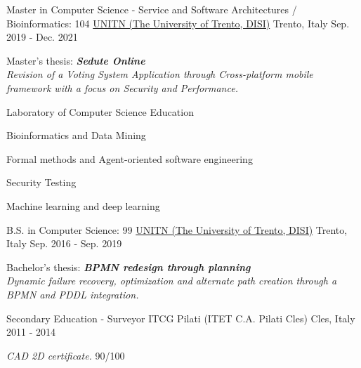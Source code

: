 

\begin{cventries}


  \cventry
    {Master in Computer Science - Service and Software Architectures / Bioinformatics: 104} %
    {\href{https://www.unitn.it/}{UNITN (The University of Trento, DISI)}}  %
    {Trento, Italy} %
    {Sep. 2019 - Dec. 2021} %
    {
      \begin{cvitems} %
        \item {Master's thesis: \textbf{\textit{Sedute Online}}\\\textit{Revision of a Voting System Application through Cross-platform mobile framework with a focus on Security and Performance.}}
        \item {Laboratory of Computer Science Education}
        \item {Bioinformatics and Data Mining}
        \item {Formal methods and Agent-oriented software engineering}
        \item {Security Testing}
        \item {Machine learning and deep learning}
      \end{cvitems}
    }

  \cventry
    {B.S. in Computer Science: 99} %
    {\href{https://www.unitn.it/}{UNITN (The University of Trento, DISI)}}  %
    {Trento, Italy} %
    {Sep. 2016 - Sep. 2019} %
    {
      \begin{cvitems} %
        \item {Bachelor's thesis: \textbf{\textit{BPMN redesign through planning}} \\\textit{Dynamic failure recovery, optimization and alternate path creation through a BPMN and PDDL integration.}}
      \end{cvitems}
    }

 \cventry
   {Secondary Education - Surveyor} %
   {ITCG Pilati (ITET C.A. Pilati Cles)} %
   {Cles, Italy} %
   {2011 - 2014} %
   {
     \begin{cvitems} %
       \item {\textit{CAD 2D certificate.}  90/100}
     \end{cvitems}
   }

\end{cventries}
